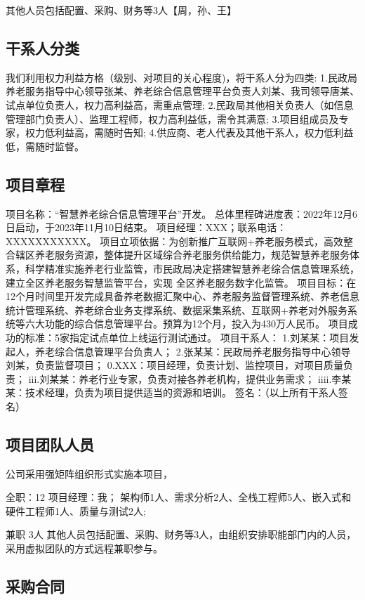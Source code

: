 \documentclass[UTF8]{../computerUniverse}
\begin{document}
其他人员包括配置、采购、财务等3人【周，孙、王】

\subsection{干系人分类}

我们利用权力利益方格（级别、对项目的关心程度)，将干系人分为四类:
1.民政局养老服务指导中心领导张某、养老综合信息管理平台负责人刘某、我司领导唐某、试点单位负责人，权力高利益高，需重点管理;
2.民政局其他相关负责人（如信息管理部门负责人）、监理工程师，权力高利益低，需令其满意;
3.项目组成员及专家，权力低利益高，需随时告知;
4.供应商、老人代表及其他干系人，权力低利益低，需随时监督。


\subsection{项目章程}

项目名称：“智慧养老综合信息管理平台”开发。
总体里程碑进度表：2022年12月6日启动，于2023年11月10日结束。
项目经理：XXX；联系电话：XXXXXXXXXXX。
项目立项依据：为创新推广互联网+养老服务模式，高效整合辖区养老服务资源，整体提升区域综合养老服务供给能力，规范智慧养老服务体系，科学精准实施养老行业监管，市民政局决定搭建智慧养老综合信息管理系统，建立全区养老服务智慧监管平台，实现
全区养老服务数字化监管。
项目目标：在12个月时间里开发完成具备养老数据汇聚中心、养老服务监督管理系统、养老信息统计管理系统、养老综合业务支撑系统、数据采集系统、互联网+养老对外服务系统等六大功能的综合信息管理平台。预算为12个月，投入为430万人民币。
项目成功的标准：5家指定试点单位上线运行测试通过。
项目干系人：
1.刘某某：项目发起人，养老综合信息管理平台负责人；
2.张某某：民政局养老服务指导中心领导刘某，负责监督项目；
0.XXX：项目经理，负责计划、监控项目，对项目质量负责；
iii.刘某某：养老行业专家，负责对接各养老机构，提供业务需求；
iiii.李某某：技术经理，负责为项目提供适当的资源和培训。
签名：（以上所有干系人签名）


\subsection{项目团队人员}

公司采用强矩阵组织形式实施本项目，

全职：12
项目经理：我；
架构师1人、需求分析2人、全栈工程师5人、嵌入式和硬件工程师1人、质量与测试2人;

兼职 3人
其他人员包括配置、采购、财务等3人，由组织安排职能部门内的人员，采用虚拟团队的方式远程兼职参与。


\subsection{采购合同}
\end{document}
